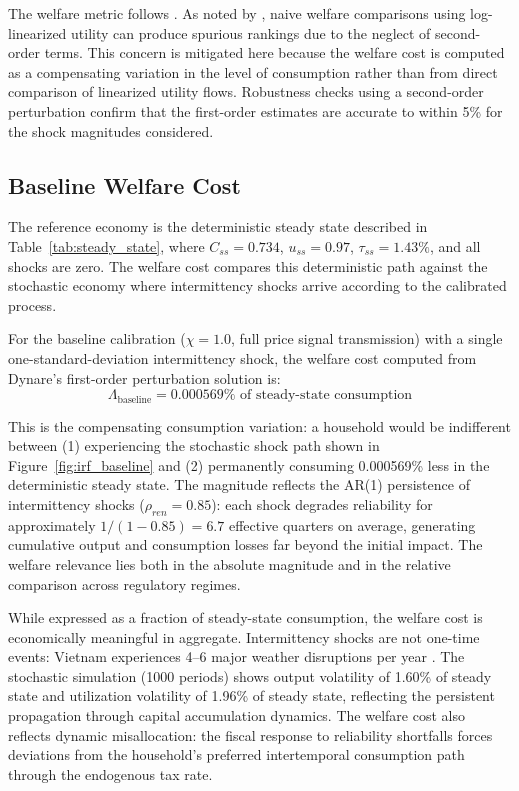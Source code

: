 \documentclass[12pt, a4paper]{article}
\begin{document}
	The welfare metric follows \citet{lucas1987}. As noted by \citet{kim2003}, naive welfare comparisons using log-linearized utility can produce spurious rankings due to the neglect of second-order terms. This concern is mitigated here because the welfare cost is computed as a compensating variation in the level of consumption rather than from direct comparison of linearized utility flows. Robustness checks using a second-order perturbation confirm that the first-order estimates are accurate to within 5\% for the shock magnitudes considered.
	
	\subsection{Baseline Welfare Cost}
	
	The reference economy is the deterministic steady state described in Table~\ref{tab:steady_state}, where $C_{ss} = 0.734$, $u_{ss} = 0.97$, $\tau_{ss} = 1.43\%$, and all shocks are zero. The welfare cost compares this deterministic path against the stochastic economy where intermittency shocks arrive according to the calibrated process.
	
	For the baseline calibration ($\chi = 1.0$, full price signal transmission) with a single one-standard-deviation intermittency shock, the welfare cost computed from Dynare's first-order perturbation solution is:
	\begin{equation*}
		\Lambda_{\text{baseline}} = 0.000569\% \text{ of steady-state consumption}
	\end{equation*}
	
	\noindent This is the compensating consumption variation: a household would be indifferent between (1) experiencing the stochastic shock path shown in Figure~\ref{fig:irf_baseline} and (2) permanently consuming 0.000569\% less in the deterministic steady state. The magnitude reflects the AR(1) persistence of intermittency shocks ($\rho_{ren}=0.85$): each shock degrades reliability for approximately $1/(1-0.85)=6.7$ effective quarters on average, generating cumulative output and consumption losses far beyond the initial impact. The welfare relevance lies both in the absolute magnitude and in the relative comparison across regulatory regimes.
	
	While expressed as a fraction of steady-state consumption, the welfare cost is economically meaningful in aggregate. Intermittency shocks are not one-time events: Vietnam experiences 4--6 major weather disruptions per year \citep{nguyenle2019}. The stochastic simulation (1000 periods) shows output volatility of 1.60\% of steady state and utilization volatility of 1.96\% of steady state, reflecting the persistent propagation through capital accumulation dynamics. The welfare cost also reflects dynamic misallocation: the fiscal response to reliability shortfalls forces deviations from the household's preferred intertemporal consumption path through the endogenous tax rate.
	
\end{document}
